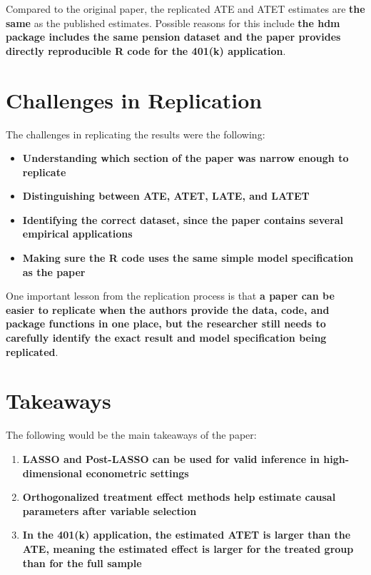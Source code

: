 \documentclass[12pt]{article}
\begin{document}
Compared to the original paper, the replicated ATE and ATET estimates are \textbf{the same} as the published estimates. Possible reasons for this include \textbf{the hdm package includes the same pension dataset and the paper provides directly reproducible R code for the 401(k) application}.

\section{Challenges in Replication}

The challenges in replicating the results were the following:

\begin{itemize}
    \item \textbf{Understanding which section of the paper was narrow enough to replicate}
    \item \textbf{Distinguishing between ATE, ATET, LATE, and LATET}
    \item \textbf{Identifying the correct dataset, since the paper contains several empirical applications}
    \item \textbf{Making sure the R code uses the same simple model specification as the paper}
\end{itemize}

One important lesson from the replication process is that \textbf{a paper can be easier to replicate when the authors provide the data, code, and package functions in one place, but the researcher still needs to carefully identify the exact result and model specification being replicated}.


\section{Takeaways}

The following would be the main takeaways of the paper:

\begin{enumerate}
    \item \textbf{LASSO and Post-LASSO can be used for valid inference in high-dimensional econometric settings}
    \item \textbf{Orthogonalized treatment effect methods help estimate causal parameters after variable selection}
    \item \textbf{In the 401(k) application, the estimated ATET is larger than the ATE, meaning the estimated effect is larger for the treated group than for the full sample}
\end{enumerate}
\end{document}
